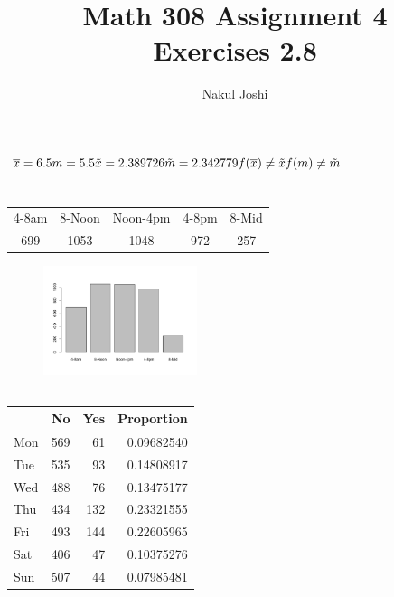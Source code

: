 \documentclass[twocolumn]{article}
\title{Math 308 Assignment 4\\Exercises 2.8}
\author{Nakul Joshi}
\newcommand{\setsection}[1]{\setcounter{section}{#1}\addtocounter{section}{-1}\section{}}
\begin{document}
\lstset{language=R}
\graphicspath{ {./img/} }
\maketitle

\setsection{2}
$
\overline{x}=6.5\\
m=5.5\\
\tilde{x}=2.389726\\
\tilde{m}=2.342779\\
f(\overline{x})\neq \tilde{x}\\
f(m)\neq \tilde{m}
$

\setsection{4}

\subsection{}
\begin{table}[h]
\centering
    \begin{tabular}{ccccc}
    4-8am & 8-Noon & Noon-4pm & 4-8pm & 8-Mid \\
    699   & 1053   & 1048     & 972   & 257   \\
    \end{tabular}
\end{table}
\begin{figure}[h]
\centering
\includegraphics[width=0.4\textwidth]{4a.pdf}
\end{figure}

\newpage

\subsection{}
\vspace{-3em}
\begin{table}[h]
\centering
\begin{tabular}{@{}lrrr@{}}
\toprule
  & No  & Yes & Proportion \\ \midrule
Mon & 569 & 61  & 0.09682540 \\
Tue & 535 & 93  & 0.14808917 \\
Wed & 488 & 76  & 0.13475177 \\
Thu & 434 & 132 & 0.23321555 \\
Fri & 493 & 144 & 0.22605965 \\
Sat & 406 & 47  & 0.10375276 \\
Sun & 507 & 44  & 0.07985481\\
\bottomrule
\end{tabular}
\end{table}
\end{document}
